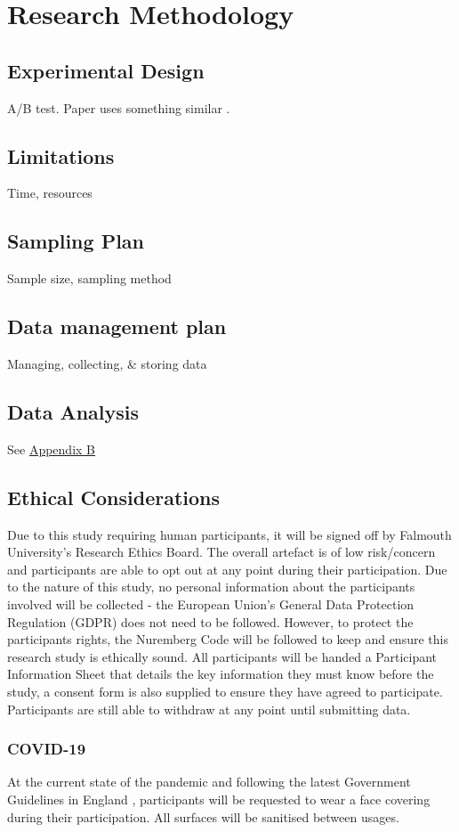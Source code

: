 \section{Research Methodology}

\subsection{Experimental Design}
A/B test. Paper uses something similar \cite{constrained-layouts}.
\subsection{Limitations}
Time, resources

\subsection{Sampling Plan}
Sample size, sampling method

\subsection{Data management plan}
Managing, collecting, \& storing data

\subsection{Data Analysis}
See \hyperref[append:b]{Appendix B}

\subsection{Ethical Considerations}
Due to this study requiring human participants, it will be signed off by Falmouth University's Research Ethics Board. The overall artefact is of low risk/concern and participants are able to opt out at any point during their participation.
Due to the nature of this study, no personal information about the participants involved will be collected - the European Union's General Data Protection Regulation (GDPR)\cite{gdpr} does not need to be followed. However, to protect the participants rights, the Nuremberg Code will be followed to keep and ensure this research study is ethically sound\cite{nuremberg-code}. All participants will be handed a Participant Information Sheet that details the key information they must know before the study, a consent form is also supplied to ensure they have agreed to participate. Participants are still able to withdraw at any point until submitting data.
\subsubsection*{COVID-19}
At the current state of the pandemic and following the latest Government Guidelines in England \cite{gov-guidlines}, participants will be requested to wear a face covering during their participation. All surfaces will be sanitised between usages.